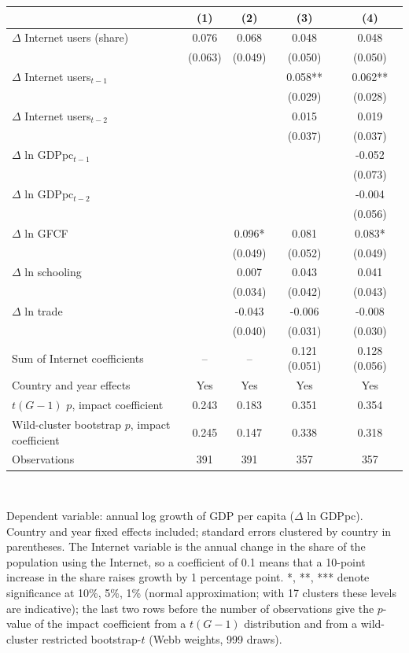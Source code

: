 \begin{tabular}{lcccc}\toprule
 & (1) & (2) & (3) & (4) \\
\midrule
$\Delta$ Internet users (share) & 0.076 & 0.068 & 0.048 & 0.048 \\
 & (0.063) & (0.049) & (0.050) & (0.050) \\
$\Delta$ Internet users$_{t-1}$ &  &  & 0.058** & 0.062** \\
 &  &  & (0.029) & (0.028) \\
$\Delta$ Internet users$_{t-2}$ &  &  & 0.015 & 0.019 \\
 &  &  & (0.037) & (0.037) \\
$\Delta$ ln GDPpc$_{t-1}$ &  &  &  & -0.052 \\
 &  &  &  & (0.073) \\
$\Delta$ ln GDPpc$_{t-2}$ &  &  &  & -0.004 \\
 &  &  &  & (0.056) \\
$\Delta$ ln GFCF &  & 0.096* & 0.081 & 0.083* \\
 &  & (0.049) & (0.052) & (0.049) \\
$\Delta$ ln schooling &  & 0.007 & 0.043 & 0.041 \\
 &  & (0.034) & (0.042) & (0.043) \\
$\Delta$ ln trade &  & -0.043 & -0.006 & -0.008 \\
 &  & (0.040) & (0.031) & (0.030) \\
\midrule
Sum of Internet coefficients & -- & -- & 0.121 (0.051) & 0.128 (0.056) \\
Country and year effects & Yes & Yes & Yes & Yes \\
$t(G-1)$ $p$, impact coefficient & 0.243 & 0.183 & 0.351 & 0.354 \\
Wild-cluster bootstrap $p$, impact coefficient & 0.245 & 0.147 & 0.338 & 0.318 \\
Observations & 391 & 391 & 357 & 357 \\
\bottomrule\end{tabular}
\\[3pt]\begin{minipage}{\tablewidth}\footnotesize Dependent variable: annual log growth of GDP per capita ($\Delta$ ln GDPpc). Country and year fixed effects included; standard errors clustered by country in parentheses. The Internet variable is the annual change in the share of the population using the Internet, so a coefficient of 0.1 means that a 10-point increase in the share raises growth by 1 percentage point. *, **, *** denote significance at 10\%, 5\%, 1\% (normal approximation; with 17 clusters these levels are indicative); the last two rows before the number of observations give the $p$-value of the impact coefficient from a $t(G-1)$ distribution and from a wild-cluster restricted bootstrap-$t$ (Webb weights, 999 draws).\end{minipage}
